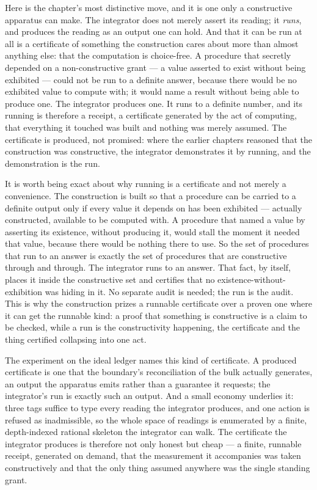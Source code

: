 Here is the chapter's most distinctive move, and it is one only a constructive apparatus can make. The
integrator does not merely assert its reading; it \emph{runs}, and produces the reading as an output one
can hold. And that it can be run at all is a certificate of something the construction cares about more
than almost anything else: that the computation is choice-free. A procedure that secretly depended on a
non-constructive grant --- a value asserted to exist without being exhibited --- could not be run to a
definite answer, because there would be no exhibited value to compute with; it would name a result
without being able to produce one. The integrator produces one. It runs to a definite number, and its
running is therefore a receipt, a certificate generated by the act of computing, that everything it
touched was built and nothing was merely assumed. The certificate is produced, not promised: where the
earlier chapters reasoned that the construction was constructive, the integrator demonstrates it by
running, and the demonstration is the run.

It is worth being exact about why running is a certificate and not merely a convenience. The construction
is built so that a procedure can be carried to a definite output only if every value it depends on has
been exhibited --- actually constructed, available to be computed with. A procedure that named a value by
asserting its existence, without producing it, would stall the moment it needed that value, because there
would be nothing there to use. So the set of procedures that run to an answer is exactly the set of
procedures that are constructive through and through. The integrator runs to an answer. That fact, by
itself, places it inside the constructive set and certifies that no existence-without-exhibition was
hiding in it. No separate audit is needed; the run is the audit. This is why the construction prizes a
runnable certificate over a proven one where it can get the runnable kind: a proof that something is
constructive is a claim to be checked, while a run is the constructivity happening, the certificate and
the thing certified collapsing into one act.

The experiment on the ideal ledger names this kind of certificate. A produced certificate is one that
the boundary's reconciliation of the bulk actually generates, an output the apparatus emits rather than
a guarantee it requests; the integrator's run is exactly such an output. And a small economy underlies
it: three tags suffice to type every reading the integrator produces, and one action is refused as
inadmissible, so the whole space of readings is enumerated by a finite, depth-indexed rational skeleton
the integrator can walk. The certificate the integrator produces is therefore not only honest but cheap
--- a finite, runnable receipt, generated on demand, that the measurement it accompanies was taken
constructively and that the only thing assumed anywhere was the single standing grant.

